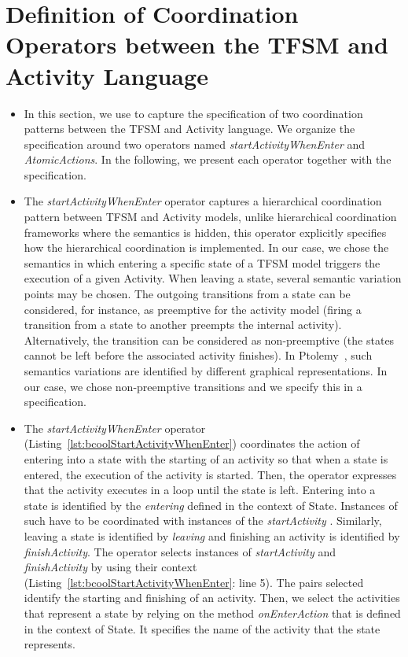 \section{Definition of Coordination Operators between the TFSM and Activity Language}
\begin{itemize}
	\item In this section, we use \bcool to capture the specification of two coordination patterns between the TFSM and Activity language. We organize the specification around two operators named  \emph{startActivityWhenEnter} and \emph{AtomicActions}. In the following, we present each operator together with the \bcool specification.
	
	\item The \emph{startActivityWhenEnter} operator captures a hierarchical coordination pattern between TFSM and Activity models, unlike hierarchical coordination frameworks where the semantics is hidden, this operator explicitly specifies how the hierarchical coordination is implemented. In our case, we chose the semantics in which entering a specific state of a TFSM model triggers the execution of a given Activity. When leaving a state, several semantic variation points may be chosen. The outgoing transitions from a state can be considered, for instance, as preemptive for the activity model (\ie firing a transition from a state to another preempts the internal activity). Alternatively, the transition can be considered as non-preemptive (\ie the states cannot be left before the associated activity finishes). In Ptolemy~\cite{modalsptolemybib}, such semantics variations are identified by different graphical representations. In our case, we chose non-preemptive transitions and we specify this in a \bcool specification.  
	 
	\item The \emph{startActivityWhenEnter} operator (Listing~\ref{lst:bcoolStartActivityWhenEnter}) coordinates the action of entering into a state with the starting of an activity so that when a state is entered, the execution of the activity is started. Then, the operator expresses that the activity executes in a loop until the state is left. Entering into a state is identified by the \textit{entering} \dse defined in the context of State. Instances of such \dse have to be coordinated with instances of the \textit{startActivity} \dse. Similarly, leaving a state is identified by \dse \textit{leaving} and finishing an activity is identified by \dse \textit{finishActivity}. The operator selects instances of \dse \emph{startActivity} and \emph{finishActivity} by using their context (Listing~\ref{lst:bcoolStartActivityWhenEnter}: line 5). The pairs selected identify the starting and finishing of an activity. Then, we select the activities that represent a state by relying on the method \emph{onEnterAction} that is defined in the context of State. It specifies the name of the activity that the state represents. 
	

\end{itemize}
